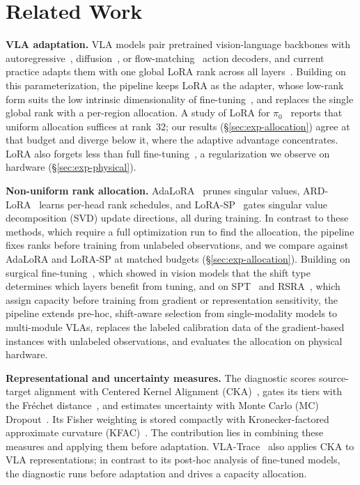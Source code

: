 \section{Related Work}
\label{sec:related-work}

\textbf{VLA adaptation.}
VLA models pair pretrained vision-language backbones with autoregressive~\cite{Brohan2023RT1, Kim2024OpenVLA, Kim2025OpenVLAOFT}, diffusion~\cite{OctoModelTeam2024, Hou2024DTP}, or flow-matching~\cite{Black2024Pi0, Shukor2025SmolVLA} action decoders, and current practice adapts them with one global LoRA rank across all layers~\cite{Kim2024OpenVLA, Kim2025OpenVLAOFT}.
Building on this parameterization, the pipeline keeps LoRA as the adapter, whose low-rank form suits the low intrinsic dimensionality of fine-tuning~\cite{Aghajanyan2021Intrinsic}, and replaces the single global rank with a per-region allocation.
A study of LoRA for $\pi_0$~\cite{Ferchau2026VLALoRA} reports that uniform allocation suffices at rank~32; our results (\S\ref{sec:exp-allocation}) agree at that budget and diverge below it, where the adaptive advantage concentrates.
LoRA also forgets less than full fine-tuning~\cite{Biderman2024LoRALearnsLess}, a regularization we observe on hardware (\S\ref{sec:exp-physical}).

\textbf{Non-uniform rank allocation.}
AdaLoRA~\cite{Zhang2023AdaLoRA} prunes singular values, ARD-LoRA~\cite{ARDLoRA2025} learns per-head rank schedules, and LoRA-SP~\cite{Kim2026LoRASP} gates singular value decomposition (SVD) update directions, all during training.
In contrast to these methods, which require a full optimization run to find the allocation, the pipeline fixes ranks before training from unlabeled observations, and we compare against AdaLoRA and LoRA-SP at matched budgets (\S\ref{sec:exp-allocation}).
Building on surgical fine-tuning~\cite{Lee2023Surgical}, which showed in vision models that the shift type determines which layers benefit from tuning, and on SPT~\cite{He2023SPT} and RSRA~\cite{Liu2026RSRA}, which assign capacity before training from gradient or representation sensitivity, the pipeline extends pre-hoc, shift-aware selection from single-modality models to multi-module VLAs, replaces the labeled calibration data of the gradient-based instances with unlabeled observations, and evaluates the allocation on physical hardware.

\textbf{Representational and uncertainty measures.}
The diagnostic scores source-target alignment with Centered Kernel Alignment (CKA)~\cite{Kornblith2019CKA}, gates its tiers with the Fr\'{e}chet distance~\cite{Dowson1982Frechet}, and estimates uncertainty with Monte Carlo (MC) Dropout~\cite{Gal2016MCDropout}.
Its Fisher weighting is stored compactly with Kronecker-factored approximate curvature (KFAC)~\cite{Martens2015KFAC}.
The contribution lies in combining these measures and applying them before adaptation.
VLA-Trace~\cite{Shi2026VLATrace} also applies CKA to VLA representations; in contrast to its post-hoc analysis of fine-tuned models, the diagnostic runs before adaptation and drives a capacity allocation.